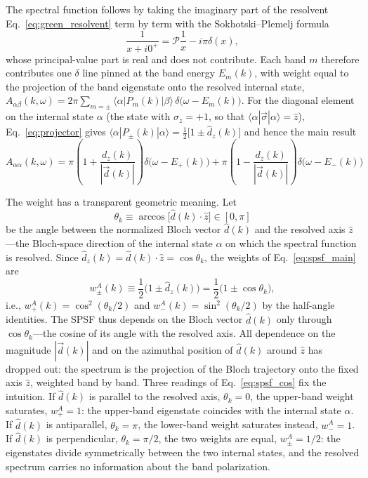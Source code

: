 \documentclass[onecolumn,aps,prl,superscriptaddress,longbibliography]{revtex4-2}
\begin{document}
The spectral function follows by taking the imaginary part of the resolvent Eq.~\eqref{eq:green_resolvent} term by term with the Sokhotski--Plemelj formula
\begin{equation}\label{eq:sokhotski}
  \frac{1}{x+i0^+} = \mathcal{P}\frac{1}{x}-i\pi\delta(x),
\end{equation}
whose principal-value part is real and does not contribute. Each band $m$ therefore contributes one $\delta$ line pinned at the band energy $E_m(k)$, with weight equal to the projection of the band eigenstate onto the resolved internal state, $A_{\alpha\beta}(k,\omega) = 2\pi\sum_{m=\pm}\langle\alpha|P_m(k)|\beta\rangle\,\delta\big(\omega-E_m(k)\big)$. For the diagonal element on the internal state $\alpha$ (the state with $\sigma_z=+1$, so that $\langle\alpha|\vec{\sigma}|\alpha\rangle=\hat{z}$), Eq.~\eqref{eq:projector} gives $\langle\alpha|P_\pm(k)|\alpha\rangle=\frac{1}{2}\big[1\pm\hat{d}_z(k)\big]$ and hence the main result
\begin{equation}\label{eq:spsf_main}
  A_{\alpha\alpha}(k,\omega)
  = \pi\left(1+\frac{d_z(k)}{|\vec{d}(k)|}\right)\delta\big(\omega-E_+(k)\big)
  + \pi\left(1-\frac{d_z(k)}{|\vec{d}(k)|}\right)\delta\big(\omega-E_-(k)\big)
\end{equation}

The weight has a transparent geometric meaning. Let
\begin{equation}\label{eq:spsf_angle}
  \theta_k\equiv\arccos\bigl[\hat d(k)\cdot\hat z\bigr]\in[0,\pi]
\end{equation}
be the angle between the normalized Bloch vector $\hat d(k)$ and the resolved axis $\hat z$---the Bloch-space direction of the internal state $\alpha$ on which the spectral function is resolved. Since $\hat d_z(k)=\hat d(k)\cdot\hat z=\cos\theta_k$, the weights of Eq.~\eqref{eq:spsf_main} are
\begin{equation}\label{eq:spsf_cos}
  w^A_\pm(k)\equiv\frac{1}{2}\bigl(1\pm\hat d_z(k)\bigr)
  =\frac{1}{2}\bigl(1\pm\cos\theta_k\bigr),
\end{equation}
i.e., $w^A_+(k)=\cos^2(\theta_k/2)$ and $w^A_-(k)=\sin^2(\theta_k/2)$ by the half-angle identities. The SPSF thus depends on the Bloch vector $\hat d(k)$ only through $\cos\theta_k$---the cosine of its angle with the resolved axis. All dependence on the magnitude $|\vec d(k)|$ and on the azimuthal position of $\hat d(k)$ around $\hat z$ has dropped out: the spectrum is the projection of the Bloch trajectory onto the fixed axis $\hat z$, weighted band by band. Three readings of Eq.~\eqref{eq:spsf_cos} fix the intuition. If $\hat d(k)$ is parallel to the resolved axis, $\theta_k=0$, the upper-band weight saturates, $w^A_+=1$: the upper-band eigenstate coincides with the internal state $\alpha$. If $\hat d(k)$ is antiparallel, $\theta_k=\pi$, the lower-band weight saturates instead, $w^A_-=1$. If $\hat d(k)$ is perpendicular, $\theta_k=\pi/2$, the two weights are equal, $w^A_\pm=1/2$: the eigenstates divide symmetrically between the two internal states, and the resolved spectrum carries no information about the band polarization.
\end{document}
